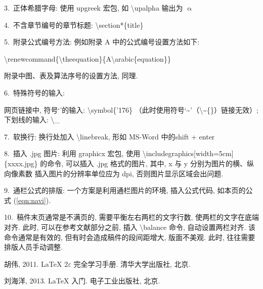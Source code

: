 \documentclass[twoside,twocolumn]{article}
\begin{document}
\begin{CJK}{UTF8}{song}
3.~正体希腊字母: 使用 upgreek 宏包, 如 \textbackslash upalpha 输出为 $\upalpha$

4.~不含章节编号的章节标题: \textbackslash section*\{title\}

5.~附录公式编号方法: 例如附录 A 中的公式编号设置方法如下: 


\noindent
{\small\textbackslash renewcommand\{\textbackslash theequation\}\{A\textbackslash arabic\{equation\}\}}

\noindent 附录中图、表及算法序号的设置方法, 同理. 


6.~特殊符号的输入: 

网页链接中, 符号‘’的输入: \textbackslash symbol\{'176\}
（此时使用符号‘\~{}’（\textbackslash\~{}\{\}）链接无效）; 
下划线的输入: \textbackslash \_

7.~软换行: 换行处加入 \textbackslash linebreak, 形如 MS-Word 中的shift + enter

8.~插入 .jpg 图片: 利用 graphicx 宏包, 
使用 \textbackslash includegraphics[width=5cm]\{xxxx.jpg\}
的命令, 可以插入 .jpg 格式的图片, 其中, x 与 y 分别为图片的横、纵向像素数
插入图片的分辨率单位应为 dpi, 否则图片显示区域会出问题. 

9.~通栏公式的排版: 一个方案是利用通栏图片的环境, 
插入公式代码, 如本页的公式 (\ref{eqn:navi}). 

10.~稿件末页通常是不满页的, 需要平衡左右两栏的文字行数, 
使两栏的文字在底端对齐. 此时, 可以在参考文献部分之前, 插入
\textbackslash balance 命令, 自动设置两栏对齐. 
该命令通常是有效的, 但有时会造成稿件的段间距增大, 
版面不美观. 此时, 往往需要排版人员手动调整. 


%
%

\begin{thebibliography}{}\footnotesize
	\itemsep -4pt
	\vspace{-8pt}
	
	胡伟, 2011.
	\newblock \LaTeX{} 2$\varepsilon$ 完全学习手册.
	\newblock 清华大学出版社, 北京.
	
	刘海洋, 2013.
	\newblock \LaTeX{} 入门.
	\newblock 电子工业出版社, 北京.
	
	
\end{thebibliography}


\end{CJK}
\end{document}
